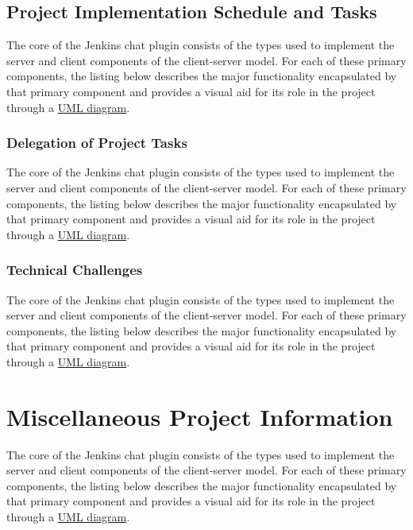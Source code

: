 \documentclass{article}
\begin{document}
		\subsection[Implementation Schedule]{Project Implementation Schedule and Tasks}
		The core of the Jenkins chat plugin consists of the types used to
		implement the server and client components of the client-server model.
		For each of these primary components, the listing below describes the
		major functionality encapsulated by that primary component and provides
		a visual aid for its role in the project through a 
		\href{http://www.csci.csusb.edu/dick/samples/uml0.html}{UML diagram}.

			\subsubsection[Task Delegation]{Delegation of Project Tasks}
			The core of the Jenkins chat plugin consists of the types used to
			implement the server and client components of the client-server model.
			For each of these primary components, the listing below describes the
			major functionality encapsulated by that primary component and provides
			a visual aid for its role in the project through a 
			\href{http://www.csci.csusb.edu/dick/samples/uml0.html}{UML diagram}.

			\subsubsection[Challenges]{Technical Challenges}
			The core of the Jenkins chat plugin consists of the types used to
			implement the server and client components of the client-server model.
			For each of these primary components, the listing below describes the
			major functionality encapsulated by that primary component and provides
			a visual aid for its role in the project through a 
			\href{http://www.csci.csusb.edu/dick/samples/uml0.html}{UML diagram}.


	\section[Appendix]{Miscellaneous Project Information}
	The core of the Jenkins chat plugin consists of the types used to
	implement the server and client components of the client-server model.
	For each of these primary components, the listing below describes the
	major functionality encapsulated by that primary component and provides
	a visual aid for its role in the project through a 
	\href{http://www.csci.csusb.edu/dick/samples/uml0.html}{UML diagram}.
\end{document}
